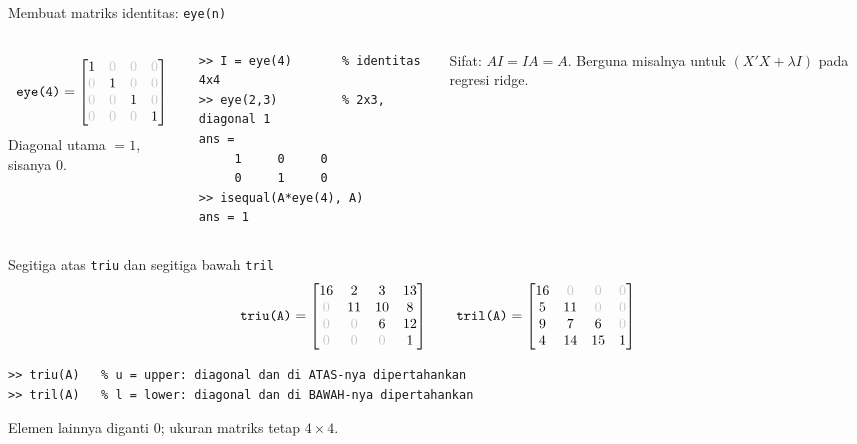 \documentclass[aspectratio=169,11pt]{beamer}
\newcommand{\z}{\textcolor{gray!45}{0}}
\begin{document}
\begin{frame}[fragile]{Membuat matriks identitas: \texttt{eye(n)}}
\begin{columns}[c]
\centering
\[
\texttt{eye(4)} =
\begin{bmatrix}
1 & \z & \z & \z\\
\z & 1 & \z & \z\\
\z & \z & 1 & \z\\
\z & \z & \z & 1
\end{bmatrix}
\]
\small Diagonal utama $=1$, sisanya $0$.
\begin{lstlisting}[basicstyle=\ttfamily\footnotesize]
>> I = eye(4)       % identitas 4x4
>> eye(2,3)         % 2x3, diagonal 1
ans =
     1     0     0
     0     1     0
>> isequal(A*eye(4), A)
ans = 1
\end{lstlisting}
\small
Sifat: $AI = IA = A$. Berguna misalnya untuk $(X'X + \lambda I)$
pada regresi ridge.
\end{columns}
\end{frame}

\begin{frame}[fragile]{Segitiga atas \texttt{triu} dan segitiga bawah \texttt{tril}}
\centering
\[
\texttt{triu(A)} =
\begin{bmatrix}
16 & 2 & 3 & 13\\
\z & 11 & 10 & 8\\
\z & \z & 6 & 12\\
\z & \z & \z & 1
\end{bmatrix}
\qquad
\texttt{tril(A)} =
\begin{bmatrix}
16 & \z & \z & \z\\
5 & 11 & \z & \z\\
9 & 7 & 6 & \z\\
4 & 14 & 15 & 1
\end{bmatrix}
\]
\begin{lstlisting}[basicstyle=\ttfamily\footnotesize]
>> triu(A)   % u = upper: diagonal dan di ATAS-nya dipertahankan
>> tril(A)   % l = lower: diagonal dan di BAWAH-nya dipertahankan
\end{lstlisting}
\small Elemen lainnya diganti $0$; ukuran matriks tetap $4\times4$.
\end{frame}
\end{document}
